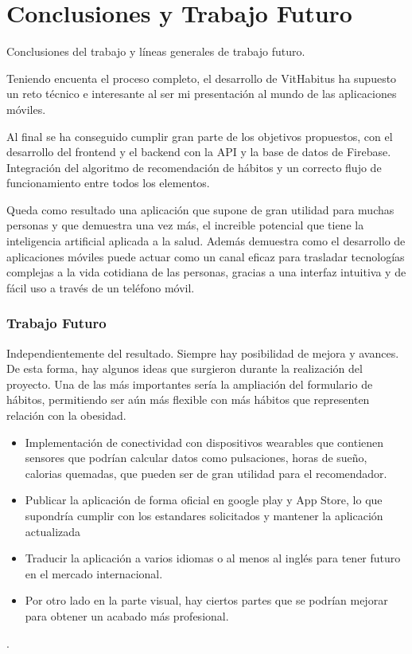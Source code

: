 \chapter{Conclusiones y Trabajo Futuro}
\label{cap:conclusiones}

Conclusiones del trabajo y líneas generales de trabajo futuro.

Teniendo encuenta el proceso completo, el desarrollo de VitHabitus ha supuesto un reto técnico e interesante al ser mi presentación al mundo de las aplicaciones móviles. 

Al final se ha conseguido cumplir gran parte de los objetivos propuestos, con el desarrollo del frontend y el backend con la API y la base de datos de Firebase.
Integración del algoritmo de recomendación de hábitos y un correcto flujo de funcionamiento entre todos los elementos.

Queda como resultado una aplicación que supone de gran utilidad para muchas personas y que demuestra una vez más, el increible potencial que tiene la inteligencia artificial aplicada a la salud. Además demuestra como el desarrollo de aplicaciones móviles puede actuar como un canal eficaz para trasladar tecnologías complejas a la vida cotidiana de las personas, gracias a una interfaz intuitiva y de fácil uso a través de un teléfono móvil.

\subsection{Trabajo Futuro}

Independientemente del resultado. Siempre hay posibilidad de mejora y avances. 
De esta forma, hay algunos ideas que surgieron durante la realización del proyecto.
Una de las más importantes sería la ampliación del formulario de hábitos, permitiendo ser aún más flexible con más hábitos que representen relación con la obesidad. 

\begin{itemize}
    \item Implementación de conectividad con dispositivos wearables que contienen sensores que podrían calcular datos como pulsaciones, horas de sueño, calorias quemadas, que pueden ser de gran utilidad para el recomendador.
    \item Publicar la aplicación de forma oficial en google play y App Store, lo que supondría cumplir con los estandares solicitados y mantener la aplicación actualizada
    \item Traducir la aplicación a varios idiomas o al menos al inglés para tener futuro en el mercado internacional. 
    \item Por otro lado en la parte visual, hay ciertos partes que se podrían mejorar para obtener un acabado más profesional.
\end{itemize}

. 



